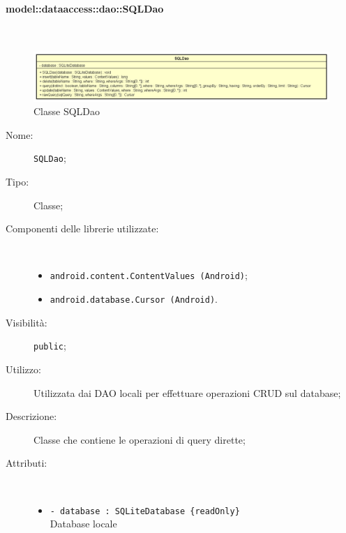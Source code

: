 \documentclass[../DefinizioneDiProdotto.tex]{subfiles}
\begin{document}
\paragraph{model::dataaccess::dao::SQLDao}
\
\begin{figure}[H]
	\centering
	\includegraphics[width=\maxwidth]{img/SQLDao.png}
	\caption{Classe SQLDao}\label{fig:model::dataaccess::dao::SQLDao} 
\end{figure}
\begin{description}
	\item[Nome:] \texttt{SQLDao};
	\item[Tipo:] Classe;
	\item[Componenti delle librerie utilizzate:] \
	\begin{itemize}
		\item \texttt{android.content.ContentValues (Android)};
		
		\item \texttt{android.database.Cursor (Android)}.
		
	\end{itemize}
	\item[Visibilità:] \texttt{public};
	\item[Utilizzo:] Utilizzata dai DAO locali per effettuare operazioni CRUD sul database;
	\item[Descrizione:] Classe che contiene le operazioni di query dirette;
	\item[Attributi:] \
	\begin{itemize}
		\item \texttt{- database : SQLiteDatabase \{readOnly\}}\\
		Database locale
		

\end{itemize}
\end{description}
\end{document}
